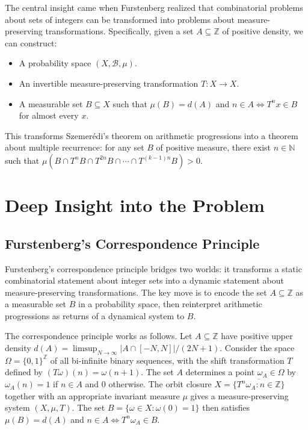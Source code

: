 The central insight came when Furstenberg realized that combinatorial problems about sets of integers can be transformed into problems about measure-preserving transformations. Specifically, given a set $A \subseteq \mathbb{Z}$ of positive density, we can construct:
\begin{itemize}
\item A probability space $(X,\mathcal{B},\mu)$.
\item An invertible measure-preserving transformation $T: X \to X$.
\item A measurable set $B \subseteq X$ such that $\mu(B) = d(A)$ and $n \in A \iff T^n x \in B$ for almost every $x$.
\end{itemize}

This transforms Szemer\'edi's theorem on arithmetic progressions into a theorem about multiple recurrence: for any set $B$ of positive measure, there exist $n \in \mathbb{N}$ such that $\mu(B \cap T^n B \cap T^{2n} B \cap \cdots \cap T^{(k-1)n} B) > 0$.

\section{Deep Insight into the Problem}

\subsection{Furstenberg's Correspondence Principle}

\begin{bigidea}
Furstenberg's correspondence principle bridges two worlds: it transforms a static combinatorial statement about integer sets into a dynamic statement about measure-preserving transformations. The key move is to encode the set $A \subseteq \mathbb{Z}$ as a measurable set $B$ in a probability space, then reinterpret arithmetic progressions as returns of a dynamical system to $B$.
\end{bigidea}

The correspondence principle works as follows. Let $A \subseteq \mathbb{Z}$ have positive upper density $d(A) = \limsup_{N \to \infty} |A \cap [-N,N]|/(2N+1)$. Consider the space $\Omega = \{0,1\}^{\mathbb{Z}}$ of all bi-infinite binary sequences, with the shift transformation $T$ defined by $(T\omega)(n) = \omega(n+1)$. The set $A$ determines a point $\omega_A \in \Omega$ by $\omega_A(n) = 1$ if $n \in A$ and $0$ otherwise. The orbit closure $X = \overline{\{T^n \omega_A : n \in \mathbb{Z}\}}$ together with an appropriate invariant measure $\mu$ gives a measure-preserving system $(X,\mu,T)$. The set $B = \{\omega \in X : \omega(0) = 1\}$ then satisfies $\mu(B) = d(A)$ and $n \in A \iff T^n \omega_A \in B$.

